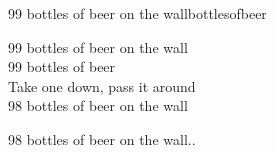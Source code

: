 \begin{song}{99 bottles of beer on the wall}{bottlesofbeer}
\begin{vers}
99 bottles of beer on the wall\\
99 bottles of beer\\
Take one down, pass it around\\
98 bottles of beer on the wall\\
\end{vers}
\begin{vers}
98 bottles of beer on the wall..\\
\end{vers}
\end{song}
